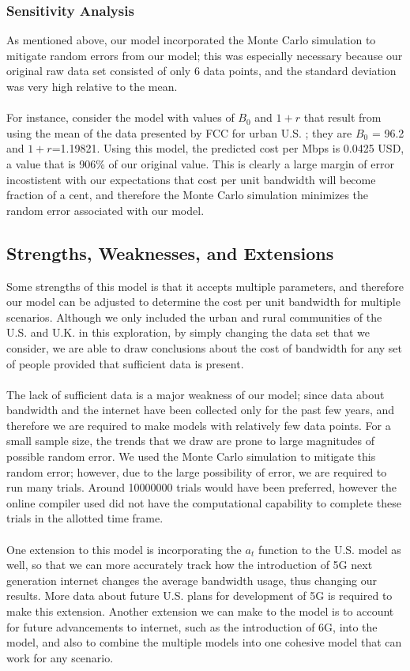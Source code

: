 \documentclass[12pt]{article}
\begin{document}
\subsubsection{Sensitivity Analysis}

As mentioned above, our model incorporated the Monte Carlo simulation to mitigate random errors from our model; this was especially necessary because our original raw data set consisted of only 6 data points, and the standard deviation was very high relative to the mean. 
\\
\\
For instance, consider the model with values of $B_0$ and $1+r$ that result from using the mean of the data presented by FCC for urban U.S. \cite{FCCData}; they are $B_0$ = 96.2 and $1+r$=1.19821. Using this model, the predicted cost per Mbps is 0.0425 USD, a value that is 906\% of our original value. This is clearly a large margin of error incostistent with our expectations that cost per unit bandwidth will become fraction of a cent, and therefore the Monte Carlo simulation minimizes the random error associated with our model.

\subsection{Strengths, Weaknesses, and Extensions}
Some strengths of this model is that it accepts multiple parameters, and therefore our model can be adjusted to determine the cost per unit bandwidth for multiple scenarios. Although we only included the urban and rural communities of the U.S. and U.K. in this exploration, by simply changing the data set that we consider, we are able to draw conclusions about the cost of bandwidth for any set of people provided that sufficient data is present. 
\\
\\
The lack of sufficient data is a major weakness of our model; since data about bandwidth and the internet have been collected only for the past few years, and therefore we are required to make models with relatively few data points. For a small sample size, the trends that we draw are prone to large magnitudes of possible random error. We used the Monte Carlo simulation to mitigate this random error; however, due to the large possibility of error, we are required to run many trials. Around 10000000 trials would have been preferred, however the online compiler used did not have the computational capability to complete these trials in the allotted time frame. 
\\
\\
One extension to this model is incorporating the $a_t$ function to the U.S. model as well, so that we can more accurately track how the introduction of 5G next generation internet changes the average bandwidth usage, thus changing our results. More data about future U.S. plans for development of 5G is required to make this extension. Another extension we can make to the model is to account for future advancements to internet, such as the introduction of 6G, into the model, and also to combine the multiple models into one cohesive model that can work for any scenario.
\end{document}
